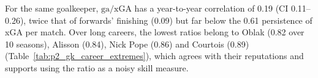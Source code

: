 \documentclass[11pt,a4paper]{article}
\begin{document}
\begin{table}

\caption{\label{tab:p2_gk_persistence}Goalkeeper year-to-year persistence (same goalkeeper, seasons t and t+1)}
\centering
{}
\end{table}

For the same goalkeeper, $\text{ga}/\text{xGA}$ has a year-to-year correlation of 0.19 (CI 0.11--0.26), twice that of forwards' finishing (0.09) but far below the 0.61 persistence of xGA per match. Over long careers, the lowest ratios belong to Oblak (0.82 over 10 seasons), Alisson (0.84), Nick Pope (0.86) and Courtois (0.89) (Table~\ref{tab:p2_gk_career_extremes}), which agrees with their reputations and supports using the ratio as a noisy skill measure.
\end{document}

